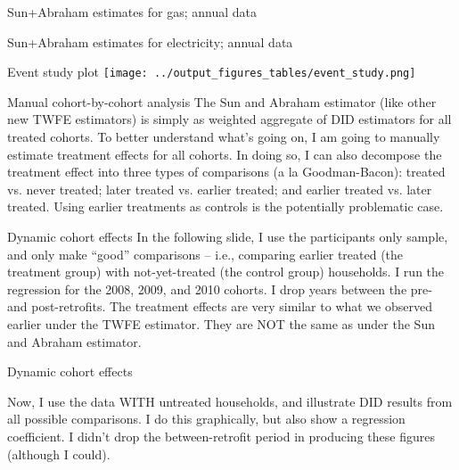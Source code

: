 \documentclass[8pt]{beamer}
\begin{document}
\begin{frame}{Sun+Abraham estimates for gas; annual data}
	
\end{frame}

\begin{frame}{Sun+Abraham estimates for electricity; annual data}
	
\end{frame}

\begin{frame}{Event study plot}
	\centering
	\texttt{[image: ../output\_figures\_tables/event\_study.png]}
\end{frame}

\begin{frame}{Manual cohort-by-cohort analysis}
	The Sun and Abraham estimator (like other new TWFE estimators) is simply as weighted aggregate of DID estimators for all treated cohorts. To better understand what's going on, I am going to manually estimate treatment effects for all cohorts.  In doing so, I can also decompose the treatment effect into three types of comparisons (a la Goodman-Bacon): treated vs. never treated; later treated vs. earlier treated; and earlier treated vs. later treated.  Using earlier treatments as controls is the potentially problematic case.
\end{frame}

\begin{frame}{Dynamic cohort effects}
	In the following slide, I use the participants only sample, and only make ``good'' comparisons -- i.e., comparing earlier treated (the treatment group) with not-yet-treated (the control group) households. I run the regression for the 2008, 2009, and 2010 cohorts.  I drop years between the pre- and post-retrofits.  The treatment effects are very similar to what we observed earlier under the TWFE estimator. They are NOT the same as under the Sun and Abraham estimator.
\end{frame}

\begin{frame}{Dynamic cohort effects}
	
\end{frame}

\begin{frame}{Now, I use the data WITH untreated households, and illustrate DID results from all possible comparisons.  I do this graphically, but also show a regression coefficient.  I didn't drop the between-retrofit period in producing these figures (although I could).}
\end{frame}
\end{document}
